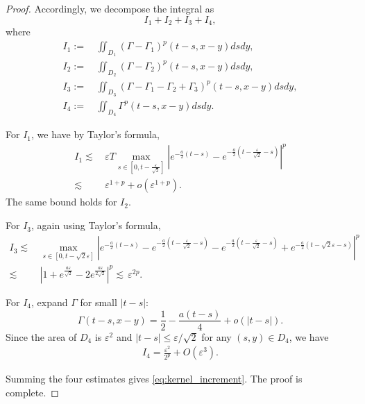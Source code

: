 \documentclass[11pt,reqno]{amsart}
\numberwithin{equation}{section}
\newcommand{\1}{{\bf 1}}
\newcommand{\2}{{\bf 2}}
\begin{document}
\begin{proof}
    Accordingly, we decompose the integral as 
    $$  I_1+I_2+I_3+I_4,$$
    where 
    \begin{align*}
     I_1:=&\, \iint_{D_1} (\Gamma-\Gamma_1)^{p} (t-s, x-y)dsdy,\\
      I_2:= &\,  \iint_{D_2} (\Gamma-\Gamma_2)^{p}(t-s, x-y) dsdy, \\
     I_{3}:=&\, \iint_{D_{3}} (\Gamma-\Gamma_1-\Gamma_2+\Gamma_{3})^{p}(t-s, x-y) dsdy,\\
       I_{4}:=&\, \iint_{D_4} \Gamma^{p}(t-s, x-y) dsdy.
    \end{align*}
             
    For $I_1$,  we have by Taylor's formula, 
     \begin{align*}
        I_1  \lesssim  &\,  \varepsilon  T\max_{s\in \left[0,t-\frac{\varepsilon}{\sqrt{2}}\right]}\left|e^{-\frac{a}{2}(t-s)}-e^{-\frac{a}{2}\left(t-\frac{\varepsilon}{\sqrt{2}}-s\right)}\right|^{p}\\
    \lesssim   &  \,     \varepsilon^{1+p} +o\left( \varepsilon^{1+p} \right).
    \end{align*}
     The same bound holds for $I_2$. 
      
      
For  $I_{3}$, again using Taylor's formula,  
    \begin{align*}
        I_{3}  \lesssim   &\,    \max_{s\in [0,t-\sqrt{2} \varepsilon]}\left|e^{-\frac{a}{2}(t-s)} - e^{-\frac{a}{2}\left(t-\frac{\varepsilon}{\sqrt{2}}-s\right)}- e^{-\frac{a}{2}\left(t-\frac{\varepsilon}{\sqrt{2}}-s\right)} +e^{-\frac{a}{2}\left(t-\sqrt{2}\varepsilon -s\right)} \right|^{p}\\
        \lesssim  &\,    \left|1+e^{\frac{a\varepsilon}{\sqrt{2}} }- 2e^{\frac{a\varepsilon}{2 \sqrt{2}} } \right|^{p} \lesssim   \,  \varepsilon^{2p}. 
     \end{align*} 
    
         
    For $I_{4}$, expand $\Gamma$ for small $|t-s|$:
    $$
   \Gamma(t-s, x-y)  = \frac12  -\frac{a(t-s)}{4} +o\left(|t-s|\right).
    $$
      Since the area of $D_4$ is $\varepsilon^2$ and   $|t-s|\le  \varepsilon/\sqrt{2}$ for  any $(s,y)\in D_4$,
   we have
      \begin{align*}
    I_{4}  =  \frac{\varepsilon^{2}}{2^p} + O\left(\varepsilon^{3}\right).
    \end{align*}
    
Summing the four estimates gives \eqref{eq:kernel_increment}. The proof is complete. 
\end{proof}
\end{document}
